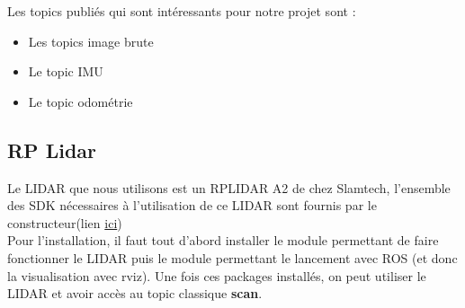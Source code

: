 \documentclass[french]{rapportENSTAB}
\begin{document}
Les topics publiés qui sont intéressants pour notre projet sont : \begin{itemize}[label=\textbullet, font=\small\color{blue}]
    \item Les topics image brute
    \item Le topic IMU
    \item Le topic odométrie 
\end{itemize}



\subsection{RP Lidar}
Le LIDAR que nous utilisons est un RPLIDAR A2 de chez Slamtech, l'ensemble des SDK nécessaires à l'utilisation de ce LIDAR sont fournis par le constructeur(lien \href{https://www.slamtec.com/en/Support#rplidar-a-series}{ici}) \\

Pour l'installation, il faut tout d'abord installer le module permettant de faire fonctionner le LIDAR puis le module permettant le lancement avec ROS (et donc la visualisation avec rviz). Une fois ces packages installés, on peut utiliser le LIDAR et avoir accès au topic classique \textbf{scan}. \\
\\
\end{document}
